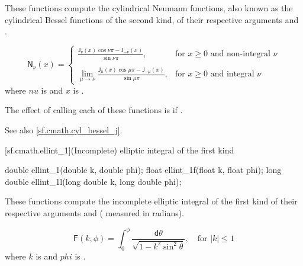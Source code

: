 \begin{itemdescr}

\pnum\effects
These functions compute the cylindrical Neumann functions,
also known as the cylindrical Bessel functions of the second kind,
of their respective arguments
 and .

\pnum\returns
\[%
  \mathsf{N}_\nu(x) =
  \left\{
  \begin{array}{cl}
  \displaystyle
  \frac{\mathsf{J}_\nu(x) \cos \nu\pi - \mathsf{J}_{-\nu}(x)}
       {\sin \nu\pi },
  & \mbox{for $x \ge 0$ and non-integral $\nu$}
  \\
  \\
  \displaystyle
  \lim_{\mu \rightarrow \nu} \frac{\mathsf{J}_\mu(x) \cos \mu\pi - \mathsf{J}_{-\mu}(x)}
                                {\sin \mu\pi },
  & \mbox{for $x \ge 0$ and integral $\nu$}
  \end{array}
  \right.
\]
where
$nu$ is  and
$x$ is .

\pnum\remarks
The effect of calling each of these functions
is 
if .

\pnum See also \ref{sf.cmath.cyl_bessel_j}.
\end{itemdescr}

[sf.cmath.ellint_1]{(Incomplete) elliptic integral of the first kind}%
%
%
%
%
%
\begin{itemdecl}
double       ellint_1(double k, double phi);
float        ellint_1f(float k, float phi);
long double  ellint_1l(long double k, long double phi);
\end{itemdecl}

\begin{itemdescr}

\pnum\effects
These functions compute
the incomplete elliptic integral of the first kind
of their respective arguments
 and  ( measured in radians).

\pnum\returns
\[%
  \mathsf{F}(k, \phi) =
  \int_0^\phi \! \frac{\mathsf{d}\theta}
                      {\sqrt{1 - k^2 \sin^2 \theta}},
	   \quad \mbox{for $|k| \le 1$}
\]
where
$k$ is  and
$phi$ is .
\end{itemdescr}

